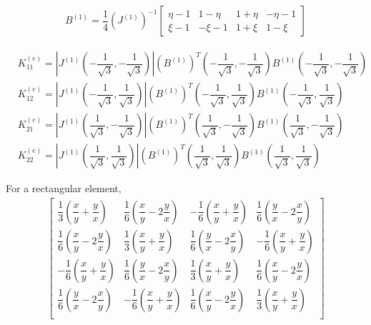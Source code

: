 \documentclass{book}
\begin{document}
\begin{align*}
    B^{(1)} = \dfrac{1}{4} (J^{(1)})^{-1} \begin{bmatrix}
        \eta - 1 & 1 - \eta & 1 + \eta & - \eta - 1 \\
        \xi - 1 & - \xi - 1 & 1 + \xi & 1 - \xi
    \end{bmatrix}
\end{align*}

\begin{align*}
    & K^{(e)}_{11} = \left| J^{(1)} \left(-\dfrac{1}{\sqrt{3}}, -\dfrac{1}{\sqrt{3}}\right)\right| (B^{(1)})^T\left(-\dfrac{1}{\sqrt{3}}, -\dfrac{1}{\sqrt{3}}\right) B^{(1)}\left(-\dfrac{1}{\sqrt{3}}, -\dfrac{1}{\sqrt{3}}\right) \\
    & K^{(e)}_{12} = \left| J^{(1)} \left(-\dfrac{1}{\sqrt{3}}, \dfrac{1}{\sqrt{3}}\right)\right| (B^{(1)})^T\left(-\dfrac{1}{\sqrt{3}}, \dfrac{1}{\sqrt{3}}\right) B^{(1)}\left(-\dfrac{1}{\sqrt{3}}, \dfrac{1}{\sqrt{3}}\right) \\
    & K^{(e)}_{21} = \left| J^{(1)} \left(\dfrac{1}{\sqrt{3}}, -\dfrac{1}{\sqrt{3}}\right)\right| (B^{(1)})^T\left(\dfrac{1}{\sqrt{3}}, -\dfrac{1}{\sqrt{3}}\right) B^{(1)}\left(\dfrac{1}{\sqrt{3}}, -\dfrac{1}{\sqrt{3}}\right) \\
    & K^{(e)}_{22} = \left| J^{(1)} \left(\dfrac{1}{\sqrt{3}}, \dfrac{1}{\sqrt{3}}\right)\right| (B^{(1)})^T\left(\dfrac{1}{\sqrt{3}}, \dfrac{1}{\sqrt{3}}\right) B^{(1)}\left(\dfrac{1}{\sqrt{3}}, \dfrac{1}{\sqrt{3}}\right)
\end{align*}



For a rectangular element,
\begin{align*}
\begin{bmatrix}
    \dfrac{1}{3} \left(\dfrac{x}{y} + \dfrac{y}{x}\right) & \dfrac{1}{6} \left(\dfrac{x}{y} - 2\dfrac{y}{x}\right) & -\dfrac{1}{6} \left(\dfrac{x}{y} + \dfrac{y}{x}\right) & \dfrac{1}{6} \left(\dfrac{y}{x} - 2\dfrac{x}{y}\right) \\
    \dfrac{1}{6} \left(\dfrac{x}{y} - 2\dfrac{y}{x}\right)  & \dfrac{1}{3} \left(\dfrac{x}{y} + \dfrac{y}{x}\right) & \dfrac{1}{6} \left(\dfrac{y}{x} - 2\dfrac{x}{y}\right) & -\dfrac{1}{6} \left(\dfrac{x}{y} + \dfrac{y}{x}\right) \\
    -\dfrac{1}{6} \left(\dfrac{x}{y} + \dfrac{y}{x}\right) & \dfrac{1}{6} \left(\dfrac{y}{x} - 2\dfrac{x}{y}\right) & \dfrac{1}{3} \left(\dfrac{x}{y} + \dfrac{y}{x}\right) & \dfrac{1}{6} \left(\dfrac{x}{y} - 2\dfrac{y}{x}\right)  \\
    \dfrac{1}{6} \left(\dfrac{y}{x} - 2\dfrac{x}{y}\right) & -\dfrac{1}{6} \left(\dfrac{x}{y} + \dfrac{y}{x}\right) & \dfrac{1}{6} \left(\dfrac{x}{y} - 2\dfrac{y}{x}\right) & \dfrac{1}{3} \left(\dfrac{x}{y} + \dfrac{y}{x}\right) \\
\end{bmatrix}
\end{align*}
\end{document}
